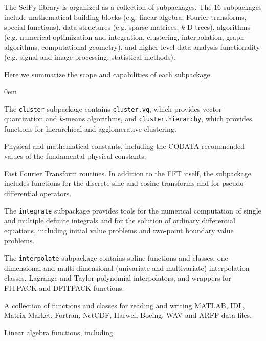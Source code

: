 The SciPy library is organized as a collection of subpackages.  The 16
subpackages include mathematical building blocks (e.g. linear algebra, Fourier
transforms, special functions), data structures (e.g. sparse matrices, $k$-D trees),
algorithms (e.g. numerical optimization and integration, clustering, interpolation,
graph algorithms, computational geometry), and higher-level data analysis
functionality (e.g. signal and image processing, statistical methods).

Here we summarize the scope and capabilities of each subpackage.

\begin{description}[leftmargin=!, labelwidth=\widthof{\bfseries \texttt{interpolate}}]
\itemsep0em
\item[\texttt{cluster}]
    The \texttt{cluster} subpackage contains \texttt{cluster.vq}, which provides vector quantization and $k$-means algorithms, and \texttt{cluster.hierarchy}, which provides functions for hierarchical and
    agglomerative clustering.
\item[\texttt{constants}]
    Physical and mathematical constants, including the CODATA recommended
    values of the fundamental physical constants\cite{CODATA2014}.
\item[\texttt{fftpack}]
    Fast Fourier Transform routines.  In addition to the FFT itself, the subpackage
    includes functions for the discrete sine and cosine transforms and for
    pseudo-differential operators.
\item[\texttt{integrate}]
    The \texttt{integrate} subpackage provides tools for the numerical
    computation of single and multiple definite integrals and for the
    solution of ordinary differential equations, including initial value
    problems and two-point boundary value problems.
\item[\texttt{interpolate}]
    The \texttt{interpolate} subpackage contains spline functions and
    classes, one-dimensional and multi-dimensional (univariate and
    multivariate) interpolation classes, Lagrange and Taylor polynomial
    interpolators, and wrappers for FITPACK\cite{Dierckx:1993:CSF:151103} and DFITPACK functions.
\item[\texttt{io}]
    A collection of functions and classes for reading and writing MATLAB\cite{matlab}, IDL,
    Matrix Market\cite{boisvert1997matrix}, Fortran, NetCDF\cite{rew1990netcdf},
		Harwell-Boeing\cite{harwellboeing}, WAV and ARFF data files.
\item[\texttt{linalg}]
    Linear algebra functions, including

\end{description}
